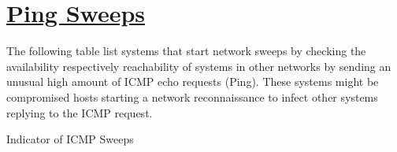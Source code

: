 %
%
%

\chapter[Ping Sweeps]{\underline{Ping Sweeps}}

\begin{flushleft}
The following table list systems that start network sweeps by checking the availability respectively reachability of systems in other networks by sending an unusual high amount of ICMP echo requests (Ping). These systems might be compromised hosts starting a network reconnaissance to infect other systems replying to the ICMP request.
\end{flushleft}


\begin{table}[H]
  \begin{center}
    \caption[\normalsize{Indicator of ICMP Sweeps}]{\small{Indicator of ICMP Sweeps}}
  \end{center}
\end{table}

